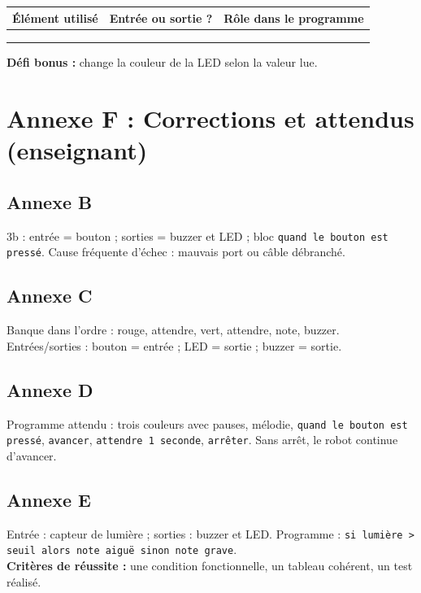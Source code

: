 \documentclass[11pt,a4paper]{article}
\begin{document}
\begin{tabularx}{\linewidth}{>{\bfseries}p{3.4cm}Y Y}
\toprule
Élément utilisé & Entrée ou sortie ? & Rôle dans le programme\\
\midrule
 & & \\ & & \\ & & \\
\bottomrule
\end{tabularx}

\textbf{Défi bonus :} change la couleur de la LED selon la valeur lue.

\newpage
\section*{Annexe F : Corrections et attendus (enseignant)}

\subsection*{Annexe B}
3b : entrée = bouton ; sorties = buzzer et LED ; bloc \texttt{quand le bouton est pressé}. Cause fréquente d'échec : mauvais port ou câble débranché.

\subsection*{Annexe C}
Banque dans l'ordre : rouge, attendre, vert, attendre, note, buzzer. Entrées/sorties : bouton = entrée ; LED = sortie ; buzzer = sortie.

\subsection*{Annexe D}
Programme attendu : trois couleurs avec pauses, mélodie, \texttt{quand le bouton est pressé}, \texttt{avancer}, \texttt{attendre 1 seconde}, \texttt{arrêter}. Sans arrêt, le robot continue d'avancer.

\subsection*{Annexe E}
Entrée : capteur de lumière ; sorties : buzzer et LED. Programme : \texttt{si lumière > seuil alors note aiguë sinon note grave}.\\
\textbf{Critères de réussite :} une condition fonctionnelle, un tableau cohérent, un test réalisé.

\newpage
\end{document}

